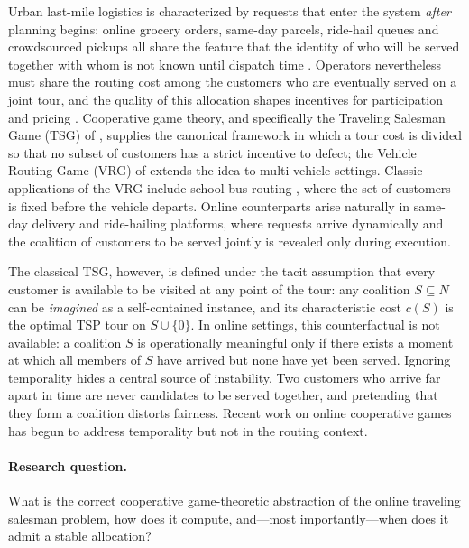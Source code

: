 \documentclass[11pt]{article}
\theoremstyle{plain}
\theoremstyle{definition}
\theoremstyle{remark}
\begin{document}
Urban last-mile logistics is characterized by requests that enter the system \emph{after} planning begins: online grocery orders, same-day parcels, ride-hail queues and crowdsourced pickups all share the feature that the identity of who will be served together with whom is not known until dispatch time \citep{pillac2013review,ausiello2001oltsp}. Operators nevertheless must share the routing cost among the customers who are eventually served on a joint tour, and the quality of this allocation shapes incentives for participation and pricing \citep{guajardo2016review}. Cooperative game theory, and specifically the Traveling Salesman Game (TSG) of \citet{potters1992tsg}, supplies the canonical framework in which a tour cost is divided so that no subset of customers has a strict incentive to defect; the Vehicle Routing Game (VRG) of \citet{gothe1996vrg,engevall2004heterogeneous} extends the idea to multi-vehicle settings. Classic applications of the VRG include school bus routing \citep{park2012schoolbus}, where the set of customers is fixed before the vehicle departs. Online counterparts arise naturally in same-day delivery and ride-hailing platforms, where requests arrive dynamically and the coalition of customers to be served jointly is revealed only during execution.

The classical TSG, however, is defined under the tacit assumption that every customer is available to be visited at any point of the tour: any coalition $S\subseteq N$ can be \emph{imagined} as a self-contained instance, and its characteristic cost $c(S)$ is the optimal TSP tour on $S\cup\{0\}$. In online settings, this counterfactual is not available: a coalition $S$ is operationally meaningful only if there exists a moment at which all members of $S$ have arrived but none have yet been served. Ignoring temporality hides a central source of instability. Two customers who arrive far apart in time are never candidates to be served together, and pretending that they form a coalition distorts fairness. Recent work on online cooperative games \citep{ge2024incentives,aziz2025participation,goyal2025temporal} has begun to address temporality but not in the routing context.

\paragraph{Research question.} What is the correct cooperative game-theoretic abstraction of the online traveling salesman problem, how does it compute, and---most importantly---when does it admit a stable allocation?
\end{document}
